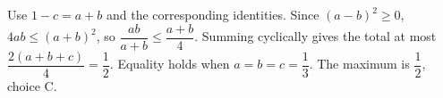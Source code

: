 Use $1-c=a+b$ and the corresponding identities. Since $(a-b)^2\ge0$, $4ab\le(a+b)^2$, so $\dfrac{ab}{a+b}\le\dfrac{a+b}{4}$. Summing cyclically gives the total at most $\dfrac{2(a+b+c)}{4}=\dfrac{1}{2}$. Equality holds when $a=b=c=\dfrac{1}{3}$. The maximum is $\boxed{\dfrac{1}{2}}$, choice C.
